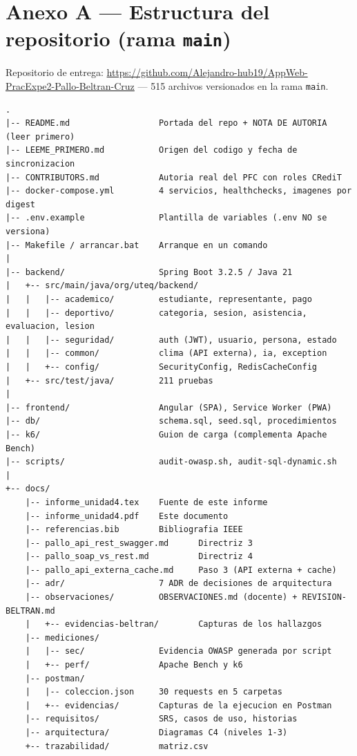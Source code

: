 \documentclass[12pt,a4paper]{article}
\begin{document}
\section{Anexo A --- Estructura del repositorio (rama \texttt{main})}
\label{apx:anexoA}

Repositorio de entrega: \url{https://github.com/Alejandro-hub19/AppWeb-PracExpe2-Pallo-Beltran-Cruz}
--- 515 archivos versionados en la rama \texttt{main}.

\begin{lstlisting}[style=bash, caption={Estructura de primer y segundo nivel}]
.
|-- README.md                  Portada del repo + NOTA DE AUTORIA (leer primero)
|-- LEEME_PRIMERO.md           Origen del codigo y fecha de sincronizacion
|-- CONTRIBUTORS.md            Autoria real del PFC con roles CRediT
|-- docker-compose.yml         4 servicios, healthchecks, imagenes por digest
|-- .env.example               Plantilla de variables (.env NO se versiona)
|-- Makefile / arrancar.bat    Arranque en un comando
|
|-- backend/                   Spring Boot 3.2.5 / Java 21
|   +-- src/main/java/org/uteq/backend/
|   |   |-- academico/         estudiante, representante, pago
|   |   |-- deportivo/         categoria, sesion, asistencia, evaluacion, lesion
|   |   |-- seguridad/         auth (JWT), usuario, persona, estado
|   |   |-- common/            clima (API externa), ia, exception
|   |   +-- config/            SecurityConfig, RedisCacheConfig
|   +-- src/test/java/         211 pruebas
|
|-- frontend/                  Angular (SPA), Service Worker (PWA)
|-- db/                        schema.sql, seed.sql, procedimientos
|-- k6/                        Guion de carga (complementa Apache Bench)
|-- scripts/                   audit-owasp.sh, audit-sql-dynamic.sh
|
+-- docs/
    |-- informe_unidad4.tex    Fuente de este informe
    |-- informe_unidad4.pdf    Este documento
    |-- referencias.bib        Bibliografia IEEE
    |-- pallo_api_rest_swagger.md      Directriz 3
    |-- pallo_soap_vs_rest.md          Directriz 4
    |-- pallo_api_externa_cache.md     Paso 3 (API externa + cache)
    |-- adr/                   7 ADR de decisiones de arquitectura
    |-- observaciones/         OBSERVACIONES.md (docente) + REVISION-BELTRAN.md
    |   +-- evidencias-beltran/        Capturas de los hallazgos
    |-- mediciones/
    |   |-- sec/               Evidencia OWASP generada por script
    |   +-- perf/              Apache Bench y k6
    |-- postman/
    |   |-- coleccion.json     30 requests en 5 carpetas
    |   +-- evidencias/        Capturas de la ejecucion en Postman
    |-- requisitos/            SRS, casos de uso, historias
    |-- arquitectura/          Diagramas C4 (niveles 1-3)
    +-- trazabilidad/          matriz.csv
\end{lstlisting}
\end{document}
